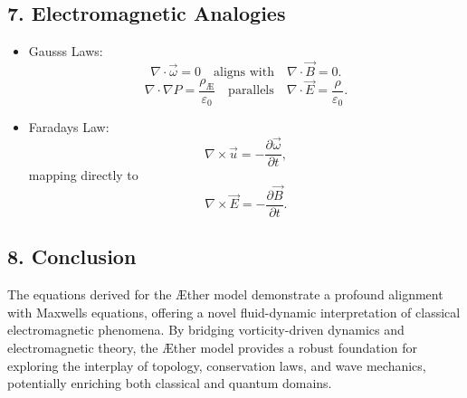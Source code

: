         \subsection*{7. Electromagnetic Analogies}
        \begin{itemize}
            \item Gauss\rqs s Laws:
            \begin{equation*}
                \nabla \cdot \vec{\omega} = 0 \quad \text{aligns with} \quad \nabla \cdot \vec{B} = 0.
            \end{equation*}
            \begin{equation*}
                \nabla \cdot \nabla P = \frac{\rho_\text{Æ}}{\varepsilon_0} \quad \text{parallels} \quad \nabla \cdot \vec{E} = \frac{\rho}{\varepsilon_0}.
            \end{equation*}
            \item Faraday\rqs s Law:
            \begin{equation*}
                \nabla \times \vec{u} = -\frac{\partial \vec{\omega}}{\partial t},
            \end{equation*}
            mapping directly to
            \begin{equation*}
                \nabla \times \vec{E} = -\frac{\partial \vec{B}}{\partial t}.
            \end{equation*}
        \end{itemize}

        \subsection*{8. Conclusion}
        The equations derived for the Æther model demonstrate a profound alignment with Maxwell\rqs s equations, offering a novel fluid-dynamic interpretation of classical electromagnetic phenomena. By bridging vorticity-driven dynamics and electromagnetic theory, the Æther model provides a robust foundation for exploring the interplay of topology, conservation laws, and wave mechanics, potentially enriching both classical and quantum domains.